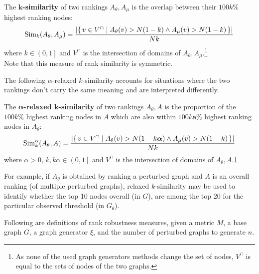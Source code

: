 \begin{savenotes}
\begin{definition}[$\bm{k}$-similarity]
    \label{def:k_similarity}
    \vspace*{-2mm}
    The \textbf{$\bm{k}$-similarity} of two rankings $A_\theta, A_\mu$ is the overlap between their $100k\%$ highest ranking nodes:
    \[ \operatorname{Sim}_k(A_\theta, A_\mu) = \frac{\left\lvert \left\{\, v \in V^{\cap} \mid  A_\theta(v) > N(1-k) \wedge A_\mu(v) > N(1-k)  \, \right\} \right\rvert}{Nk} \]
    where $k \in \left( 0, 1 \right]$ and $V^{\cap}$ is the intersection of domains of $A_\theta, A_\mu$.\footnote{\label{foot:v_intersection_equal}As none of the used graph generators methods change the set of nodes, $V^{\cap}$ is equal to the sets of nodes of the two graphs.}\\
    Note that this measure of rank similarity is symmetric.
\end{definition}
\end{savenotes}

The following $\alpha$-relaxed $k$-similarity accounts for situations where the two rankings don't carry the same meaning and are interpreted differently.

\begin{definition}
    \label{def:alpha_relaxed_k_similarity}
    \vspace*{-2mm}
    The \textbf{$\bm{\alpha}$-relaxed $\bm{k}$-similarity} of two rankings $A_\theta, A$ is the proportion of the $100k\%$ highest ranking nodes in $A$ which are also within $100k\bm{a}\%$ highest ranking nodes in $A_\theta$:
    \[ \operatorname{Sim}_k^\alpha(A_\theta, A) = \frac{\left\lvert \left\{\, v \in V^{\cap} \mid  A_\theta(v) > N(1-k\bm{\alpha}) \wedge A_\mu(v) > N(1-k)  \, \right\} \right\rvert}{Nk} \]
    where $\alpha > 0$, $k, k\alpha \in \left( 0, 1 \right]$ and $V^{\cap}$ is the intersection of domains of $A_\theta, A$.\cref{foot:v_intersection_equal}
\end{definition}

For example, if $A_\theta$ is obtained by ranking a perturbed graph and $A$ is an overall ranking (of multiple perturbed graphs), relaxed $k$-similarity may be used to identify whether the top 10 nodes overall (in $G$), are among the top 20 for the particular observed threshold (in $G_\theta$).

Following are definitions of rank robustness measures, given a metric $M$, a base graph $G$, a graph generator $\xi$, and the number of perturbed graphs to generate $n$.

